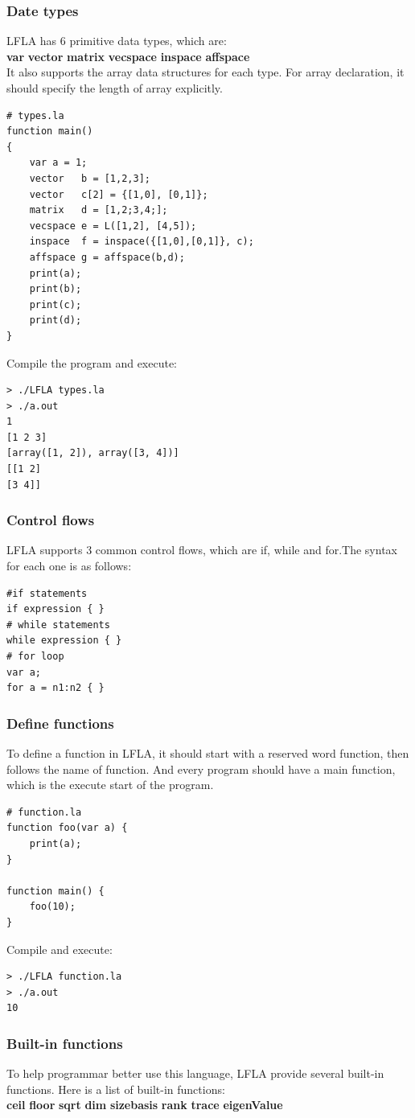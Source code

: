 \documentclass[12pt]{article} %
\begin{document}
\subsubsection{Date types}
\noindent LFLA has 6 primitive data types, which are:\\
\textbf{var}  \quad  \textbf{vector} \quad \textbf{matrix}  \quad\textbf{vecspace} \quad\textbf{ inspace} \quad \textbf{affspace} \\
It also supports the array data structures for each type. For array declaration, it should specify the length of array explicitly. 
\begin{lstlisting}
# types.la
function main()
{
	var a = 1;
	vector 	 b = [1,2,3];
	vector 	 c[2] = {[1,0], [0,1]};
	matrix 	 d = [1,2;3,4;];
	vecspace e = L([1,2], [4,5]);
	inspace  f = inspace({[1,0],[0,1]}, c);
	affspace g = affspace(b,d);
	print(a);
	print(b);
	print(c);
	print(d);
}
\end{lstlisting}
Compile the program and execute:
\begin{lstlisting} 
> ./LFLA types.la
> ./a.out
1
[1 2 3]
[array([1, 2]), array([3, 4])]
[[1 2]
[3 4]]
\end{lstlisting}	
\subsubsection{Control flows} 
\noindent LFLA supports 3 common control flows, which are if, while and for.The syntax for each one is as follows:
\begin{lstlisting} 
#if statements
if expression { }
# while statements
while expression { }
# for loop
var a;
for a = n1:n2 { }
\end{lstlisting}
\subsubsection{Define functions}
\noindent To define a function in LFLA, it should start with a reserved word function, then follows the name of function. And every program should have a main function, which is the execute start of the program.
\begin{lstlisting} 
# function.la
function foo(var a) {	
	print(a);	
}

function main() {
	foo(10);
}
\end{lstlisting}
Compile and execute:
\begin{lstlisting} 
> ./LFLA function.la
> ./a.out
10
\end{lstlisting}
\subsubsection{Built-in functions} 
\noindent To help programmar better use this language, LFLA provide several built-in functions. Here is a list of built-in functions:\\
\textbf{ceil}  \quad  \textbf{floor} \quad \textbf{sqrt}  \quad\textbf{dim} \quad\textbf{size}\quad\textbf{basis} \quad \textbf{rank} 
\quad \textbf{trace} \quad \textbf{eigenValue}\\
\end{document}
